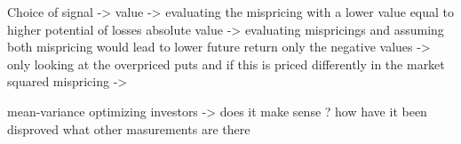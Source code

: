 
Choice of signal ->
	value -> evaluating the mispricing with a lower value equal to higher potential of losses
	absolute value -> evaluating mispricings and assuming both mispricing would lead to lower future return
	only the negative values -> only looking at the overpriced puts and if this is priced differently in the market
	squared mispricing -> 
	
mean-variance optimizing investors ->
	does it make sense ? 
	how have it been disproved
	what other masurements are there
	